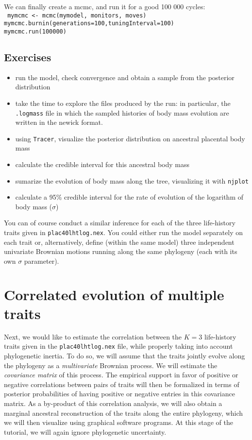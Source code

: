 \documentclass[usletter]{article}
\newcommand{\cmd}[1]{\texttt{#1}}
\begin{document}
We can finally create a mcmc, and run it for a good 100 000 cycles:
\\
\cmd{
mymcmc <- mcmc(mymodel, monitors, moves)
\\
mymcmc.burnin(generations=100,tuningInterval=100)
\\
mymcmc.run(100000)
}

\subsection*{Exercises}

\begin{itemize}
\item
run the model, check convergence and obtain a sample from the posterior distribution
\item
take the time to explore the files produced by the run: in particular, the \cmd{.logmass} file in which the sampled histories of body mass evolution are written in the newick format.
\item
using \cmd{Tracer}, visualize the posterior distribution on ancestral placental body mass
\item
calculate the credible interval for this ancestral body mass
\item
sumarize the evolution of body mass along the tree, visualizing it with \cmd{njplot}
\item
calculate a 95\% credible interval for the rate of evolution of the logarithm of body mass ($\sigma$)
\end{itemize}

You can of course conduct a similar inference for each of the three life-history traits given in \cmd{plac40lhtlog.nex}. You could either run the model separately on each trait or, alternatively, define (within the same model) three independent univariate Brownian motions running along the same phylogeny (each with its own $\sigma$ parameter).


\section{Correlated evolution of multiple traits}
\label{multivariate}

Next, we would like to estimate the correlation between the $K=3$ life-history traits given in the \cmd{plac40lhtlog.nex} file, while properly taking into account phylogenetic inertia. 
To do so, we will assume that the traits jointly evolve along the phylogeny as a \emph{multivariate} Brownian process.
We will estimate the \emph{covariance matrix} of this process. The empirical support in favor of positive or negative correlations between pairs of traits will then be formalized in terms of posterior probabilities of having positive or negative entries in this covariance matrix.
As a by-product of this correlation analysis, we will also obtain a marginal ancestral reconstruction of the traits along the entire phylogeny, which we will then visualize using graphical software programs.
At this stage of the tutorial, we will again ignore phylogenetic uncertainty.
\end{document}
